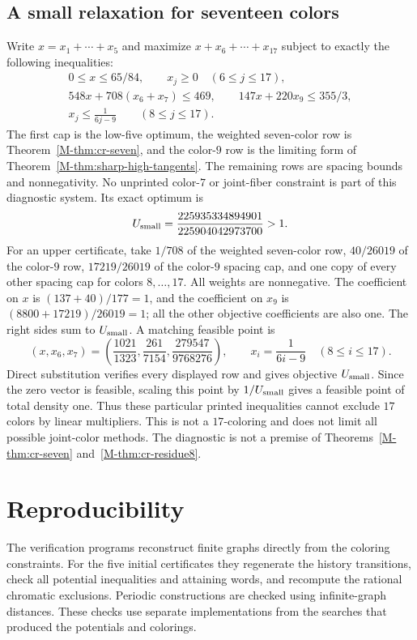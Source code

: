 \documentclass[11pt,reqno]{amsart}
\theoremstyle{plain}
\theoremstyle{plain}
\theoremstyle{plain}
\begin{document}
\subsection*{A small relaxation for seventeen colors}
Write $x=x_1+\cdots+x_5$ and maximize
$x+x_6+\cdots+x_{17}$ subject to exactly the following inequalities:
\[
 \begin{gathered}
 0\le x\le65/84,\qquad x_j\ge0\quad(6\le j\le17),\\
 548x+708(x_6+x_7)\le469,\qquad
 147x+220x_9\le355/3,\\
 x_j\le\frac1{6j-9}\qquad(8\le j\le17).
 \end{gathered}
\]
The first cap is the low-five optimum, the weighted seven-color row is
Theorem~\ref*{M-thm:cr-seven}, and the color-$9$ row is the limiting form
of Theorem~\ref*{M-thm:sharp-high-tangents}. The remaining rows are spacing
bounds and nonnegativity. No unprinted color-$7$ or joint-fiber constraint
is part of this diagnostic system. Its exact optimum is
\[
 U_{\rm small}=\frac{225935334894901}{225904042973700}>1.
\]
For an upper certificate, take $1/708$ of the weighted seven-color row,
$40/26019$ of the color-$9$ row, $17219/26019$ of the color-$9$ spacing
cap, and one copy of every other spacing cap for colors $8,\ldots,17$.
All weights are nonnegative. The coefficient on $x$ is
$(137+40)/177=1$, and the coefficient on $x_9$ is
$(8800+17219)/26019=1$; all the other objective coefficients are also one.
The right sides sum to $U_{\rm small}$. A matching feasible point is
\[
 (x,x_6,x_7)=\left(\frac{1021}{1323},\frac{261}{7154},\frac{279547}{9768276}\right),\qquad
 x_i=\frac1{6i-9}\quad(8\le i\le17).
\]
Direct substitution verifies every displayed row and gives objective
$U_{\rm small}$. Since the zero vector is feasible, scaling this point
by $1/U_{\rm small}$ gives a feasible point of total density one.
Thus these particular printed inequalities cannot exclude $17$ colors
by linear multipliers. This is not a $17$-coloring and does not limit
all possible joint-color methods. The diagnostic is not a premise of
Theorems~\ref*{M-thm:cr-seven} and~\ref*{M-thm:cr-residue8}.


\section{Reproducibility}\label{S-supp:replay}
The verification programs reconstruct finite graphs directly from the
coloring constraints. For the five initial certificates they regenerate
the history transitions, check all potential inequalities and attaining
words, and recompute the rational chromatic exclusions. Periodic
constructions are checked using infinite-graph distances. These checks
use separate implementations from the searches that produced the
potentials and colorings.
\end{document}
